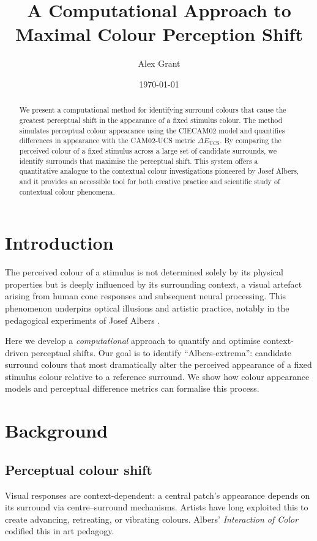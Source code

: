 \documentclass[11pt]{article}
\title{A Computational Approach to Maximal Colour Perception Shift}
\author{Alex Grant}
\affil{Improbability Engineering}
\date{\today}
\begin{document}
\maketitle

\begin{abstract}
We present a computational method for identifying surround colours that cause the greatest perceptual shift in the appearance of a fixed stimulus colour. The method simulates perceptual colour appearance using the CIECAM02 model and quantifies differences in appearance with the CAM02-UCS metric $\Delta E_{\mathrm{UCS}}$. By comparing the perceived colour of a fixed stimulus across a large set of candidate surrounds, we identify surrounds that maximise the perceptual shift. This system offers a quantitative analogue to the contextual colour investigations pioneered by Josef Albers, and it provides an accessible tool for both creative practice and scientific study of contextual colour phenomena.
\end{abstract}

\section{Introduction}
The perceived colour of a stimulus is not determined solely by its physical properties but is deeply influenced by its surrounding context, a visual artefact arising from human cone responses and subsequent neural processing. This phenomenon underpins optical illusions and artistic practice, notably in the pedagogical experiments of Josef Albers \parencite{albers1963interaction}.

Here we develop a \emph{computational} approach to quantify and optimise context-driven perceptual shifts. Our goal is to identify ``Albers-extrema'': candidate surround colours that most dramatically alter the perceived appearance of a fixed stimulus colour relative to a reference surround. We show how colour appearance models and perceptual difference metrics can formalise this process.

\section{Background}
\subsection{Perceptual colour shift}
Visual responses are context-dependent: a central patch’s appearance depends on its surround via centre–surround mechanisms. Artists have long exploited this to create advancing, retreating, or vibrating colours. Albers’ \emph{Interaction of Color} \parencite{albers1963interaction} codified this in art pedagogy.
\end{document}

